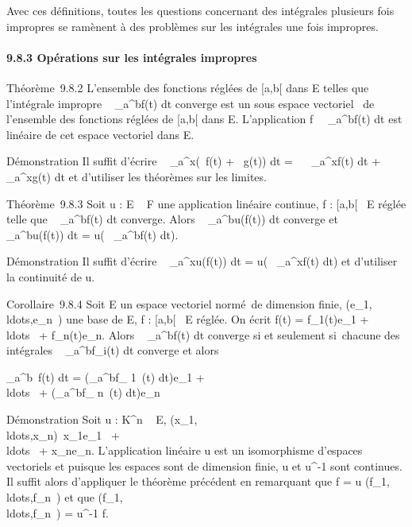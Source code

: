 \documentclass[]{article}
\begin{document}
Avec ces définitions, toutes les questions concernant des intégrales
plusieurs fois impropres se ramènent à des problèmes sur les intégrales
une fois impropres.

\paragraph{9.8.3 Opérations sur les intégrales impropres}

Théorème~9.8.2 L'ensemble des fonctions réglées de {[}a,b{[} dans E
telles que l'intégrale impropre \int ~
\_a^bf(t) dt converge est un sous espace vectoriel ~de
l'ensemble des fonctions réglées de {[}a,b{[} dans E. L'application
f\mapsto~\int ~
\_a^bf(t) dt est linéaire de cet espace vectoriel dans E.

Démonstration Il suffit d'écrire \int ~
\_a^x(\alpha~f(t) + \beta~g(t)) dt = \alpha~\int ~
\_a^xf(t) dt + \beta~\int ~
\_a^xg(t) dt et d'utiliser les théorèmes sur les limites.

Théorème~9.8.3 Soit u : E \rightarrow~ F une application linéaire continue, f :
{[}a,b{[}\rightarrow~ E réglée telle que \int ~
\_a^bf(t) dt converge. Alors \int ~
\_a^bu(f(t)) dt converge et \int ~
\_a^bu(f(t)) dt = u(\int ~
\_a^bf(t) dt).

Démonstration Il suffit d'écrire \int ~
\_a^xu(f(t)) dt = u(\int ~
\_a^xf(t) dt) et d'utiliser la continuité de u.

Corollaire~9.8.4 Soit E un espace vectoriel normé~de dimension finie,
(e\_1,\\ldots,e\_n~)
une base de E, f : {[}a,b{[}\rightarrow~ E réglée. On écrit f(t) =
f\_1(t)e\_1 +
\\ldots~ +
f\_n(t)e\_n. Alors \int ~
\_a^bf(t) dt converge si et seulement si~chacune des
intégrales \int ~
\_a^bf\_i(t) dt converge et alors

\int  \_a^b~f(t) dt =
(\int  \_a^bf\_ 1~(t)
dt)e\_1 +
\\ldots~ +
(\int  \_a^bf\_ n~(t)
dt)e\_n

Démonstration Soit u : K^n \rightarrow~ E,
(x\_1,\\ldots,x\_n)\mapsto~x\_1e\_1~
+ \\ldots~ +
x\_ne\_n. L'application linéaire u est un isomorphisme
d'espaces vectoriels et puisque les espaces sont de dimension finie, u
et u^-1 sont continues. Il suffit alors d'appliquer le
théorème précédent en remarquant que f = u \cdot
(f\_1,\\ldots,f\_n~)
et que
(f\_1,\\ldots,f\_n~)
= u^-1 \cdot f.
\end{document}

